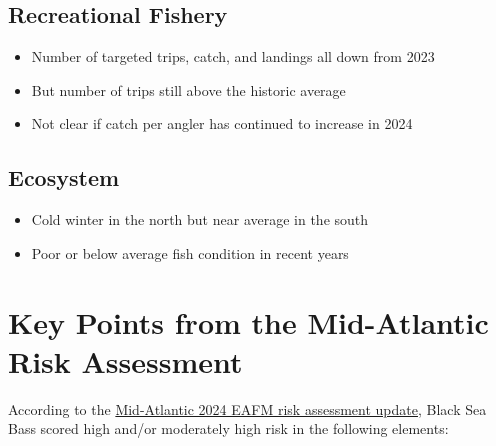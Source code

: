 \documentclass[
]{article}
\providecommand{\tightlist}{%
  \setlength{\itemsep}{0pt}\setlength{\parskip}{0pt}}
\begin{document}
\subsection{Recreational Fishery}

\begin{itemize}
\tightlist
\item
  Number of targeted trips, catch, and landings all down from 2023
\item
  But number of trips still above the historic average
\item
  Not clear if catch per angler has continued to increase in 2024
\end{itemize}

\subsection{Ecosystem}

\begin{itemize}
\tightlist
\item
  Cold winter in the north but near average in the south
\item
  Poor or below average fish condition in recent years
\end{itemize}

\vspace{0.5cm}
\section{Key Points from the Mid-Atlantic Risk Assessment}

\vspace{-3cm}

\raggedright

According to the
\href{https://static1.squarespace.com/static/511cdc7fe4b00307a2628ac6/t/6747560a3cf66936045e5547/1732728332670/05_EAFM+Risk+Assessment.pdf}{Mid-Atlantic
2024 EAFM risk assessment update}, Black Sea Bass scored high and/or
moderately high risk in the following elements:
\end{document}
